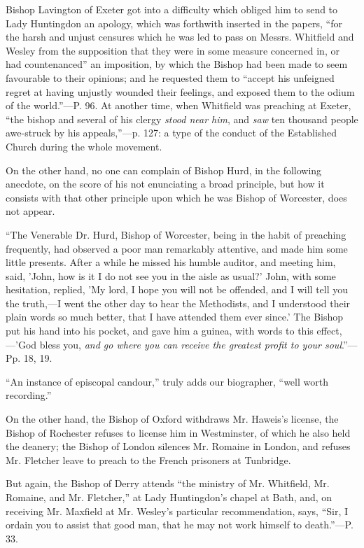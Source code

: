Bishop Lavington of Exeter got into a difficulty
which obliged him to send to Lady Huntingdon an apology, which was
forthwith inserted in the papers, ``for the harsh and unjust censures
which he was led to pass on Messrs. Whitfield and Wesley from the
supposition that they were in some measure concerned in, or had
countenanced'' an imposition, by which the Bishop had been made to seem
favourable to their opinions; and he requested them to ``accept his
unfeigned regret at having unjustly wounded their feelings, and
exposed them to the odium of the world.''—P. 96. At another time,
when Whitfield was preaching at Exeter, ``the bishop and several of his
clergy \emph{stood near him}, and \emph{saw} ten thousand people
awe-struck by his appeals,''—p. 127: a type of the conduct of the
Established Church during the whole movement.

On the other hand, no one can complain of Bishop
Hurd, in the following anecdote, on the score of his not enunciating a
broad principle, but how it consists with that other principle upon
which he was Bishop of Worcester, does not appear.

``The
Venerable Dr. Hurd, Bishop of Worcester, being in the habit of
preaching frequently, had observed a poor man remarkably attentive,
and made him some little presents. After a while he missed his humble
auditor, and meeting him, said, 'John, how is it I
do not see you in the aisle as usual?' John, with some hesitation,
replied, 'My lord, I hope you will not be offended, and I will tell
you the truth,—I went the other day to hear the Methodists, and I
understood their plain words so much better, that I have attended them
ever since.' The Bishop put his hand into his pocket, and gave him a
guinea, with words to this effect,—'God bless you, \emph{and go where
you can receive the greatest profit to your soul}.''—Pp. 18, 19.

``An instance of episcopal candour,'' truly adds
our biographer, ``well worth recording.''

On the other hand, the Bishop of Oxford withdraws
Mr. Haweis's license, the Bishop of Rochester refuses to license him
in Westminster, of which he also held the deanery; the Bishop of
London silences Mr. Romaine in London, and refuses Mr. Fletcher leave
to preach to the French prisoners at Tunbridge.

But again, the Bishop of Derry attends ``the
ministry of Mr. Whitfield, Mr. Romaine, and Mr. Fletcher,'' at Lady
Huntingdon's chapel at Bath, and, on receiving Mr. Maxfield at Mr.
Wesley's particular recommendation, says, ``Sir, I ordain you to assist
that good man, that he may not work himself to death.''—P. 33.

